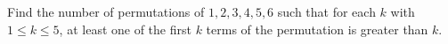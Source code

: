Find the number of permutations of $1,2,3,4,5,6$ such that for each $k$ with $1\leq k\leq 5$,  at least one of the first $k$ terms of the permutation is greater than $k$.